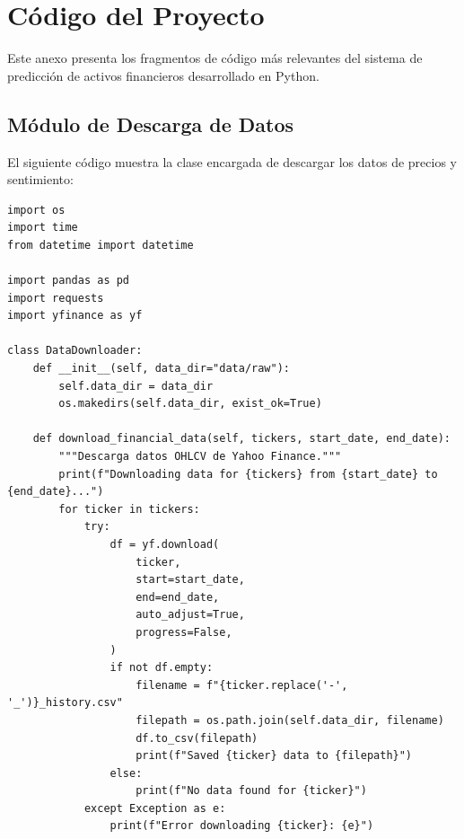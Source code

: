 \chapter{Código del Proyecto}
\label{ch:codigo}

Este anexo presenta los fragmentos de código más relevantes del sistema de predicción de activos financieros desarrollado en Python.

\section{Módulo de Descarga de Datos}

El siguiente código muestra la clase encargada de descargar los datos de precios y sentimiento:

\lstset{style=codestyle, language=Python}
\begin{lstlisting}[frame=single, caption={Descargador de datos financieros}]
import os
import time
from datetime import datetime

import pandas as pd
import requests
import yfinance as yf

class DataDownloader:
    def __init__(self, data_dir="data/raw"):
        self.data_dir = data_dir
        os.makedirs(self.data_dir, exist_ok=True)
        
    def download_financial_data(self, tickers, start_date, end_date):
        """Descarga datos OHLCV de Yahoo Finance."""
        print(f"Downloading data for {tickers} from {start_date} to {end_date}...")
        for ticker in tickers:
            try:
                df = yf.download(
                    ticker,
                    start=start_date,
                    end=end_date,
                    auto_adjust=True,
                    progress=False,
                )
                if not df.empty:
                    filename = f"{ticker.replace('-', '_')}_history.csv"
                    filepath = os.path.join(self.data_dir, filename)
                    df.to_csv(filepath)
                    print(f"Saved {ticker} data to {filepath}")
                else:
                    print(f"No data found for {ticker}")
            except Exception as e:
                print(f"Error downloading {ticker}: {e}")
	    

\end{lstlisting}
